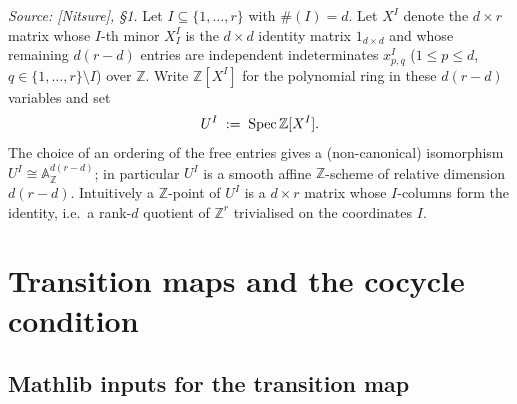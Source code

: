 \begin{definition}\leanok
  \label{def:gr_affine_chart}
  \textit{Source: [Nitsure], \S 1.}
  Let \(I \subseteq \{1, \dots, r\}\) with \(\#(I) = d\). Let \(X^I\) denote the
  \(d \times r\) matrix whose \(I\)-th minor \(X^I_I\) is the \(d \times d\)
  identity matrix \(1_{d \times d}\) and whose remaining \(d(r - d)\) entries are
  independent indeterminates \(x^I_{p,q}\) (\(1 \le p \le d\),
  \(q \in \{1,\dots,r\} \setminus I\)) over \(\mathbb{Z}\). Write
  \(\mathbb{Z}[X^I]\) for the polynomial ring in these \(d(r-d)\) variables and
  set
  \[
    U^I \;:=\; \operatorname{Spec} \mathbb{Z}[X^I].
  \]
  The choice of an ordering of the free entries gives a (non-canonical)
  isomorphism \(U^I \cong \mathbb{A}^{d(r-d)}_{\mathbb{Z}}\); in particular
  \(U^I\) is a smooth affine \(\mathbb{Z}\)-scheme of relative dimension
  \(d(r-d)\). Intuitively a \(\mathbb{Z}\)-point of \(U^I\) is a \(d \times r\)
  matrix whose \(I\)-columns form the identity, i.e.\ a rank-\(d\) quotient of
  \(\mathbb{Z}^{r}\) trivialised on the coordinates \(I\).
\end{definition}

\section{Transition maps and the cocycle condition}
\label{sec:gr_transition}

\subsection*{Mathlib inputs for the transition map}

